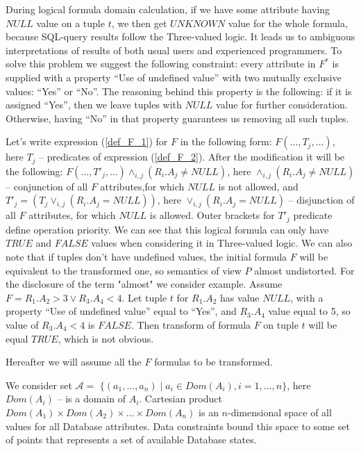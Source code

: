 \documentclass{article}
\def \n #1{\mathit{#1}}
\begin{document}
During logical formula domain calculation, if we have some attribute having 
$NULL$ value on a tuple $t$, we then get $\n{UNKNOWN}$ value for the whole
formula, because SQL-query results follow the Three-valued logic. It leads us to
ambiguous interpretations of results of both usual users and experienced
programmers. To solve this problem we suggest the following constraint: every
attribute in $F^{\ast}$ is supplied with a property ``Use of undefined value''
with two mutually exclusive values: ``Yes'' or ``No''. The reasoning behind this
property is the following: if it is assigned ``Yes'', then we leave tuples with
$\n{NULL}$ value for further consideration. Otherwise, having ``No'' in that
property guarantees us removing all such tuples.

Let's write expression (\ref{def_F_1}) for $F$ in the following form: $ F (\dots
, T_j , \dots )$, here $T_j$ -- predicates of expression (\ref{def_F_2}). After
the modification it will be the following: $F( \dots, T'_j , \dots )\wedge_{i,j}
(R_i .A_j \neq \n{NULL})$, here $\wedge_{i,j}(R_i .A_j \neq \n{NULL})$
-- conjunction of all $F$ attributes,for which $\n{NULL}$ is not allowed, and
$T'_j = (T_j \vee_{i,j}(R_i .A_j = \n{NULL}))$, here $\vee_{i,j}(R_i .A_j =
\n{NULL})$ -- disjunction of all $F$ attributes, for which $\n{NULL}$ is allowed.
Outer brackets for $T'_j$ predicate define operation priority. We can see that
this logical formula can only have $\n{TRUE}$ and $\n{FALSE}$ values when
considering it in Three-valued logic. We can also note that if tuples don't have
undefined values, the initial formula $F$ will be equivalent to the transformed
one, so semantics of view $P$ almost undistorted. For the disclosure of the term
"almost" we consider example. Assume $F = R_1.A_2 > 3 \vee R_3.A_4 < 4$. Let
tuple $t$ for $R_1.A_2$ has value $\n{NULL}$, with a property ``Use of undefined
value'' equal to ``Yes'', and $R_3.A_4$ value equal to 5, so value of
$R_3.A_4 < 4$ is $\n{FALSE}$. Then transform of formula $F$ on tuple $t$ will be
equal $\n{TRUE}$, which is not obvious.

Hereafter we will assume all the $F$ formulas to be transformed.

We consider set $\mathcal{A} =$ $\{(a_1, \dots, a_n) \mid a_i \in Dom(A_i),
i=1,\dots,n\}$, here $Dom(A_i)$ -- is a domain of $A_i$. Cartesian product
$Dom(A_1)\times Dom(A_2)\times \dots \times Dom(A_n)$ is an $n$-dimensional
space of all values for all Database attributes. Data constraints bound this
space to some set of points that represents a set of available Database
states.
\end{document}
